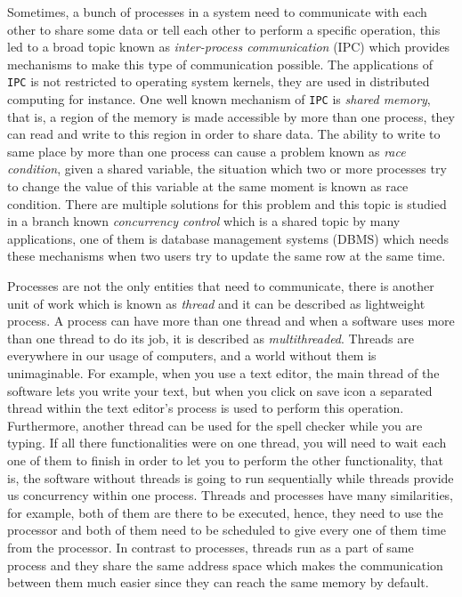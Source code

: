 Sometimes, a bunch of processes in a system need to communicate with
each other to share some data or tell each other to perform a specific
operation, this led to a broad topic known as \emph{inter-process
communication} (IPC) which provides mechanisms to make this type of
communication possible. The applications of \lstinline!IPC! is not
restricted to operating system kernels, they are used in distributed
computing for instance. One well known mechanism of \lstinline!IPC! is
\emph{shared memory}, that is, a region of the memory is made accessible
by more than one process, they can read and write to this region in
order to share data. The ability to write to same place by more than one
process can cause a problem known as \emph{race condition}, given a
shared variable, the situation which two or more processes try to change
the value of this variable at the same moment is known as race
condition. There are multiple solutions for this problem and this topic
is studied in a branch known \emph{concurrency control} which is a
shared topic by many applications, one of them is database management
systems (DBMS) which needs these mechanisms when two users try to update
the same row at the same time.

Processes are not the only entities that need to communicate, there is
another unit of work which is known as \emph{thread} and it can be
described as lightweight process. A process can have more than one
thread and when a software uses more than one thread to do its job, it
is described as \emph{multithreaded}. Threads are everywhere in our
usage of computers, and a world without them is unimaginable. For
example, when you use a text editor, the main thread of the software
lets you write your text, but when you click on save icon a separated
thread within the text editor's process is used to perform this
operation. Furthermore, another thread can be used for the spell checker
while you are typing. If all there functionalities were on one thread,
you will need to wait each one of them to finish in order to let you to
perform the other functionality, that is, the software without threads
is going to run sequentially while threads provide us concurrency within
one process. Threads and processes have many similarities, for example,
both of them are there to be executed, hence, they need to use the
processor and both of them need to be scheduled to give every one of
them time from the processor. In contrast to processes, threads run as a
part of same process and they share the same address space which makes
the communication between them much easier since they can reach the same
memory by default.

